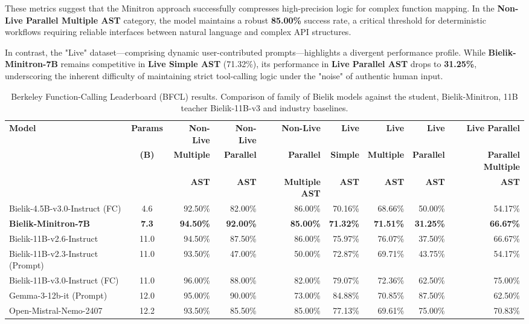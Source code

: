 \documentclass{article}
\begin{document}
These metrics suggest that the Minitron approach successfully compresses high-precision logic for complex function mapping. In the \textbf{Non-Live Parallel Multiple AST} category, the model maintains a robust \textbf{85.00\%} success rate, a critical threshold for deterministic workflows requiring reliable interfaces between natural language and complex API structures.

In contrast, the "Live" dataset—comprising dynamic user-contributed prompts—highlights a divergent performance profile. While \textbf{Bielik-Minitron-7B} remains competitive in \textbf{Live Simple AST} (71.32\%), its performance in \textbf{Live Parallel AST} drops to \textbf{31.25\%}, underscoring the inherent difficulty of maintaining strict tool-calling logic under the "noise" of authentic human input.


\begin{table}[t]
    \centering
    \scriptsize
    \begin{tabular}{lcrrrrrrr}
    \toprule
    \textbf{Model} & \textbf{Params} & \textbf{Non-Live} & \textbf{Non-Live} & \textbf{Non-Live} & \textbf{Live} & \textbf{Live} & \textbf{Live} & \textbf{Live Parallel} \\
    & \textbf{(B)} & \textbf{Multiple} & \textbf{Parallel} & \textbf{Parallel} & \textbf{Simple} & \textbf{Multiple} & \textbf{Parallel} & \textbf{Parallel Multiple} \\
    & \textbf{} & \textbf{AST} & \textbf{AST} & \textbf{Multiple AST} & \textbf{AST} & \textbf{AST} & \textbf{AST} & \textbf{AST} \\
    \midrule
    Bielik-4.5B-v3.0-Instruct (FC) & 4.6 & 92.50\% & 82.00\% & 86.00\% & 70.16\% & 68.66\% & 50.00\% & 54.17\% \\
    \textbf{Bielik-Minitron-7B} & \textbf{7.3} & \textbf{94.50\%} & \textbf{92.00\%} & \textbf{85.00\%} & \textbf{71.32\%} & \textbf{71.51\%} & \textbf{31.25\%} & \textbf{66.67\%} \\
    Bielik-11B-v2.6-Instruct & 11.0 & 94.50\% & 87.50\% & 86.00\% & 75.97\% & 76.07\% & 37.50\% & 66.67\% \\
    Bielik-11B-v2.3-Instruct (Prompt) & 11.0 & 93.50\% & 47.00\% & 50.00\% & 72.87\% & 69.71\% & 43.75\% & 54.17\% \\
    Bielik-11B-v3.0-Instruct (FC) & 11.0 & 96.00\% & 88.00\% & 82.00\% & 79.07\% & 72.36\% & 62.50\% & 75.00\% \\
    Gemma-3-12b-it (Prompt) & 12.0 & 95.00\% & 90.00\% & 73.00\% & 84.88\% & 70.85\% & 87.50\% & 62.50\% \\
    Open-Mistral-Nemo-2407 & 12.2 & 93.50\% & 85.50\% & 85.00\% & 77.13\% & 69.61\% & 75.00\% & 70.83\% \\
    \bottomrule
    \end{tabular}
    \caption{Berkeley Function-Calling Leaderboard (BFCL) results. Comparison of family of Bielik models against the student, Bielik-Minitron, 11B teacher Bielik-11B-v3 and industry baselines.}
    \label{tab:ast-comparison-v3}
\end{table}
\end{document}
